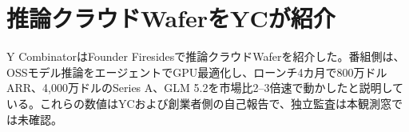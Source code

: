 \section{推論クラウドWaferをYCが紹介}
Y CombinatorはFounder Firesidesで推論クラウドWaferを紹介した。番組側は、OSSモデル推論をエージェントでGPU最適化し、ローンチ4カ月で800万ドルARR、4,000万ドルのSeries A、GLM 5.2を市場比2--3倍速で動かしたと説明している。これらの数値はYCおよび創業者側の自己報告で、独立監査は本観測窓では未確認。
